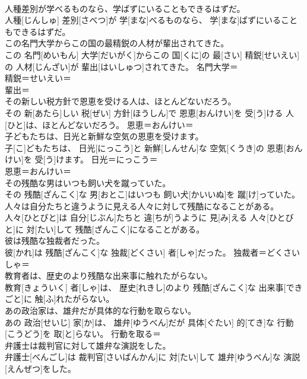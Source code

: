 \documentclass[8pt]{extreport}
\begin{document}
\begin{CJK}{UTF8}{min}
\\	人種差別が学べるものなら、学ばずにいることもできるはずだ。	
\\	人種[じんしゅ] 差別[さべつ]が 学[まな]べるものなら、 学[まな]ばずにいることもできるはずだ。	
\\	この名門大学からこの国の最精鋭の人材が輩出されてきた。	
\\	この 名門[めいもん] 大学[だいがく]からこの 国[くに]の 最[さい] 精鋭[せいえい]の 人材[じんざい]が 輩出[はいしゅつ]されてきた。	名門大学＝ 
\\	精鋭＝せいえい＝ 
\\	輩出＝ 
\\	その新しい税方針で恩恵を受ける人は、ほとんどないだろう。	
\\	その 新[あたら]しい 税[ぜい] 方針[ほうしん]で 恩恵[おんけい]を 受[う]ける 人[ひと]は、ほとんどないだろう。	恩恵＝おんけい＝ 
\\	子どもたちは、日光と新鮮な空気の恩恵を受けます。	
\\	子[こ]どもたちは、 日光[にっこう]と 新鮮[しんせん]な 空気[くうき]の 恩恵[おんけい]を 受[う]けます。	日光＝にっこう＝ 
\\	恩恵＝おんけい＝ 
\\	その残酷な男はいつも飼い犬を蹴っていた。	
\\	その 残酷[ざんこく]な 男[おとこ]はいつも 飼い犬[かいいぬ]を 蹴[け]っていた。	
\\	人々は自分たちと違うように見える人々に対して残酷になることがある。	
\\	人々[ひとびと]は 自分[じぶん]たちと 違[ちが]うように 見[み]える 人々[ひとびと]に 対[たい]して 残酷[ざんこく]になることがある。	
\\	彼は残酷な独裁者だった。	
\\	彼[かれ]は 残酷[ざんこく]な 独裁[どくさい] 者[しゃ]だった。	独裁者＝どくさいしゃ＝ 
\\	教育者は、歴史のより残酷な出来事に触れたがらない。	
\\	教育[きょういく] 者[しゃ]は、 歴史[れきし]のより 残酷[ざんこく]な 出来事[できごと]に 触[ふ]れたがらない。	
\\	あの政治家は、雄弁だが具体的な行動を取らない。	
\\	あの 政治[せいじ] 家[か]は、 雄弁[ゆうべん]だが 具体[ぐたい] 的[てき]な 行動[こうどう]を 取[と]らない。	行動を取る＝ 
\\	弁護士は裁判官に対して雄弁な演説をした。	
\\	弁護士[べんごし]は 裁判官[さいばんかん]に 対[たい]して 雄弁[ゆうべん]な 演説[えんぜつ]をした。	

\end{CJK}
\end{document}
